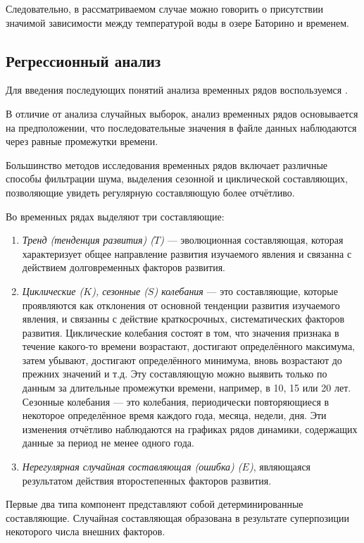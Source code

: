 Следовательно, в рассматриваемом случае можно говорить о присутствии значимой зависимости между температурой воды в озере Баторино и временем.


\subsection{Регрессионный анализ} %
\label{sec:regr_analysis}

Для введения последующих понятий анализа временных рядов воспользуемся \cite{Eddows1997}.

В отличие от анализа случайных выборок, анализ временных рядов основывается на предположении, что последовательные значения в файле данных наблюдаются через равные промежутки времени.

Большинство методов исследования временных рядов включает различные способы фильтрации шума, выделения сезонной и циклической составляющих, позволяющие увидеть регулярную составляющую более отчётливо.

Во временных рядах выделяют три составляющие:
\begin{enumerate}
	\item \textit{Тренд (тенденция развития) ($T$)} --- эволюционная составляющая, которая характеризует общее направление развития изучаемого явления и связанна с действием долговременных факторов развития.
	\item \textit{Циклические ($K$), сезонные ($S$) колебания} --- это составляющие, которые проявляются как отклонения от основной тенденции развития изучаемого явления, и связанны с действие краткосрочных, систематических факторов развития. Циклические колебания состоят в том, что значения признака в течение какого-то времени возрастают, достигают определённого максимума, затем убывают, достигают определённого минимума, вновь возрастают до прежних значений и т.д. Эту составляющую можно выявить только по данным за длительные промежутки времени, например, в 10, 15 или 20 лет. Сезонные колебания --- это колебания, периодически повторяющиеся в некоторое определённое время каждого года, месяца, недели, дня. Эти изменения отчётливо наблюдаются на графиках рядов динамики, содержащих данные за период не менее одного года.
	\item \textit{Нерегулярная случайная составляющая (ошибка) ($E$)}, являющаяся результатом действия второстепенных факторов развития.
\end{enumerate}
Первые два типа компонент представляют собой детерминированные составляющие. Случайная составляющая образована в результате суперпозиции некоторого числа внешних факторов.

